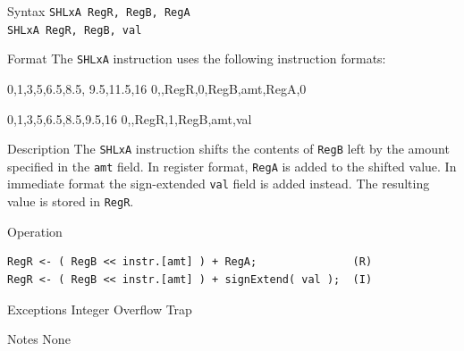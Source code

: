 %
%
%
\pagebreak
{}

\begin{iPageDescEntry}{Syntax}
\texttt{SHLxA RegR, RegB, RegA} \\
\texttt{SHLxA RegR, RegB, val}
\end{iPageDescEntry}

\begin{iPageDescEntry}{Format}
The \texttt{SHLxA} instruction uses the following instruction formats: \\

\begin{flushleft}
\drawInstrFormat
    {0,1,3,5,6.5,8.5, 9.5,11.5,16}
    {0,\OpCodeSHLxA,RegR,0,RegB,amt,RegA,0}
\end{flushleft}

\medskip
\begin{flushleft}
\drawInstrFormat
    {0,1,3,5,6.5,8.5,9.5,16}
    {0,\OpCodeSHLxA,RegR,1,RegB,amt,val}
\end{flushleft}
\end{iPageDescEntry}

\begin{iPageDescEntry}{Description}
The \texttt{SHLxA} instruction shifts the contents of \texttt{RegB} left by the amount specified in the \texttt{amt} field. In register format, \texttt{RegA} is added to the shifted value. In immediate format the sign-extended \texttt{val} field is added instead.  The resulting value is stored in \texttt{RegR}.
\end{iPageDescEntry}

\begin{iPageDescOpEntry}{Operation}
\begin{lstlisting}[style=iPageOpStyle]
RegR <- ( RegB << instr.[amt] ) + RegA;               (R)
RegR <- ( RegB << instr.[amt] ) + signExtend( val );  (I)
\end{lstlisting}
\end{iPageDescOpEntry}

\begin{iPageDescEntry}{Exceptions}
Integer Overflow Trap
\end{iPageDescEntry}

\begin{iPageDescEntry}{Notes}
None
\end{iPageDescEntry}






